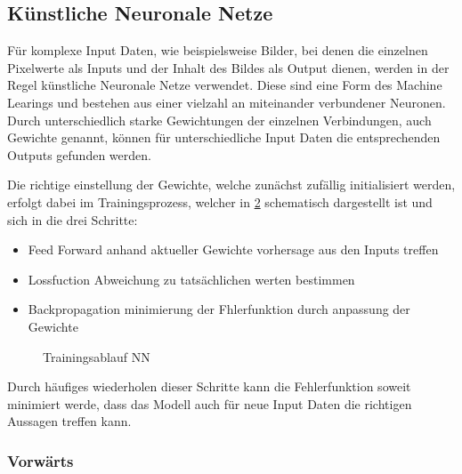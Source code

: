 
\subsection{Künstliche Neuronale Netze} \label{sec:nn}

Für komplexe Input Daten, wie beispielsweise Bilder, bei denen 
die einzelnen Pixelwerte als Inputs und der Inhalt des Bildes als 
Output dienen, werden in der Regel künstliche Neuronale Netze verwendet.
Diese sind eine Form des Machine Learings und bestehen aus einer 
vielzahl an miteinander verbundener Neuronen. Durch unterschiedlich 
starke Gewichtungen der einzelnen Verbindungen, auch Gewichte genannt, 
können für unterschiedliche Input Daten die entsprechenden Outputs 
gefunden werden.

\begin{figure}[htb]
    \centering
    \label{fig:nn}
    \def\svgwidth{0.5\columnwidth}
    \footnotesize
    
\end{figure}


Die richtige einstellung der Gewichte, welche zunächst zufällig initialisiert werden, 
erfolgt dabei im Trainingsprozess, welcher in \ref{fig:train} schematisch
 dargestellt ist und sich in die drei Schritte:
\begin{itemize}
    \item Feed Forward anhand aktueller Gewichte vorhersage aus den Inputs treffen
    \item Lossfuction Abweichung zu tatsächlichen werten bestimmen
    \item Backpropagation minimierung der Fhlerfunktion durch anpassung der Gewichte
\end{itemize}

\begin{figure}[htb]
    \centering
    \label{fig:train}
    \def\svgwidth{0.5\columnwidth}
    
    \caption{Trainingsablauf NN}
\end{figure}

Durch häufiges wiederholen dieser Schritte kann die Fehlerfunktion soweit minimiert werde, 
dass das Modell auch für neue Input Daten die richtigen Aussagen treffen kann.



\subsubsection{Vorwärts}\label{subsec:percepron}

